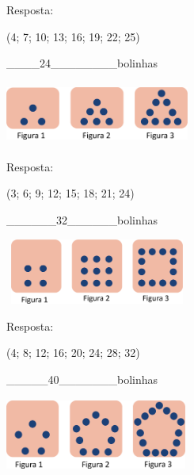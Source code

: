 \begin{escolha}

Resposta:

(4; 7; 10; 13; 16; 19; 22; 25)

\begin{escolha}

\item
  \_\_\_\_24\_\_\_\_\_\_\_\_bolinhas
\end{escolha}

\includegraphics[width=2.38354in,height=0.81674in]{media/image33.png}


Resposta:

(3; 6; 9; 12; 15; 18; 21; 24)

\begin{escolha}

\item
  \_\_\_\_\_\_32\_\_\_\_\_\_bolinhas
\end{escolha}

\includegraphics[width=2.38354in,height=0.85007in]{media/image34.png}


Resposta:

(4; 8; 12; 16; 20; 24; 28; 32)

\begin{escolha}

\item
  \_\_\_\_\_40\_\_\_\_\_\_\_bolinhas
\end{escolha}

\includegraphics[width=2.35854in,height=0.94175in]{media/image35.png}


\end{escolha}
